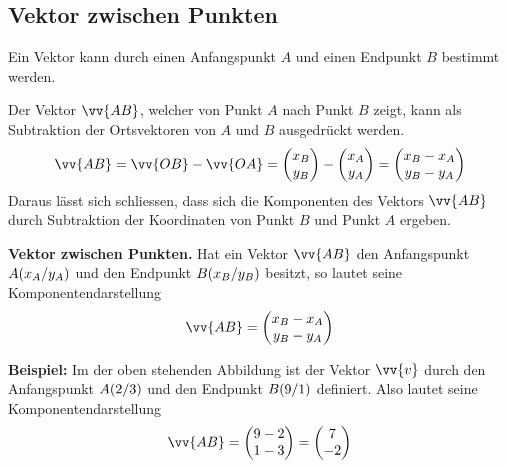 \subsection{Vektor zwischen Punkten}

Ein Vektor kann durch einen Anfangspunkt $A$ und einen Endpunkt $B$ bestimmt werden.
\begin{center}
\end{center}
Der Vektor $\vv{AB}$, welcher von Punkt $A$ nach Punkt $B$ zeigt, kann als Subtraktion der Ortsvektoren von $A$ und $B$ ausgedrückt werden.
\[
  \vv{AB} = \vv{OB} - \vv{OA} = \dvec{x_{B},y_{B}} - \dvec{x_{A},y_{A}} = \dvec{x_{B}-x_{A},y_{B}-y_{A}}
\]
Daraus lässt sich schliessen, dass sich die Komponenten des Vektors $\vv{AB}$ durch Subtraktion der Koordinaten von Punkt $B$ und Punkt $A$ ergeben.
\begin{theorem}
  \textbf{Vektor zwischen Punkten.} Hat ein Vektor $\vv{AB}$ den Anfangspunkt $\coord[A]{x_{A},y_{A}}$ und den Endpunkt $\coord[B]{x_{B},y_{B}}$ besitzt, so lautet seine Komponentendarstellung
  \[
    \vv{AB} = \dvec{x_{B}-x_{A},y_{B}-y_{A}}
  \]
\end{theorem}
\begin{example}
  \textbf{Beispiel:} Im der oben stehenden Abbildung ist der Vektor $\vv{v}$ durch den Anfangspunkt $\coord[A]{2,3}$ und den Endpunkt $\coord[B]{9,1}$ definiert. Also lautet seine Komponentendarstellung
  \[
    \vv{AB} = \dvec{9-2,1-3} = \dvec{7,-2}
  \]
\end{example}
